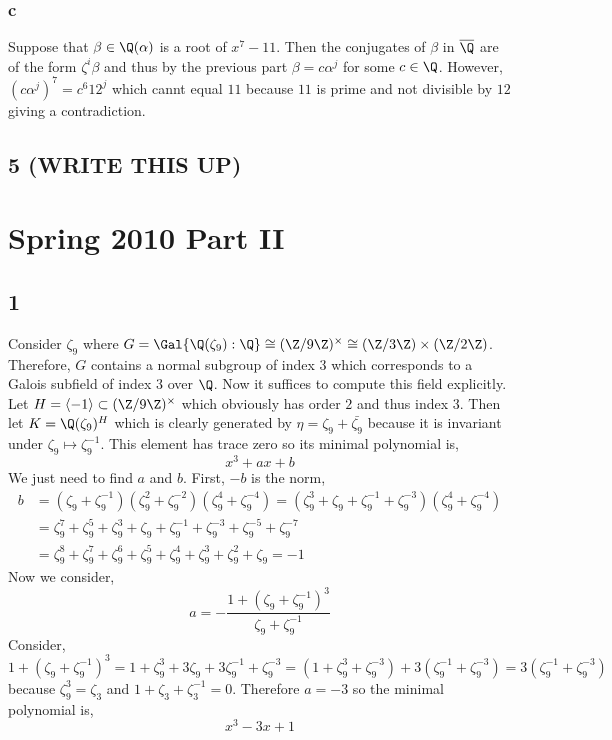 \documentclass[12pt]{article}
\begin{document}
\subsubsection{c}

Suppose that $\beta \in \Q(\alpha)$ is a root of $x^7 - 11$. Then the conjugates of $\beta$ in $\overline{\Q}$ are of the form $\zeta^i \beta$ and thus by the previous part $\beta = c \alpha^j$ for some $c \in \Q$. However, $(c \alpha^j)^7 = c^6 12^j$ which cannt equal $11$ because $11$ is prime and not divisible by $12$ giving a contradiction.

\subsection{5 (WRITE THIS UP)}


\section{Spring 2010 Part II}

\subsection{1}

Consider $\zeta_9$ where $G = \Gal{\Q(\zeta_9) : \Q} \cong (\Z / 9 \Z)^\times \cong (\Z / 3 \Z) \times (\Z / 2 \Z)$. Therefore, $G$ contains a normal subgroup of index $3$ which corresponds to a Galois subfield of index $3$ over $\Q$. Now it suffices to compute this field explicitly.
\bigskip\\
Let $H = \left< -1 \right> \subset (\Z / 9 \Z)^\times$ which obviously has order $2$ and thus index $3$. Then let $K = \Q(\zeta_9)^H$ which is clearly generated by $\eta = \zeta_9 + \bar{\zeta_9}$ because it is invariant under $\zeta_9 \mapsto \zeta_9^{-1}$. This element has trace zero so its minimal polynomial is,
\[ x^3 + a x + b \]
We just need to find $a$ and $b$. First, $-b$ is the norm,
\begin{align*}
b &= (\zeta_9 + \zeta_9^{-1})(\zeta_9^2 + \zeta_9^{-2})(\zeta_9^4 + \zeta_9^{-4}) = (\zeta_9^3 + \zeta_9 + \zeta_9^{-1} + \zeta_9^{-3})(\zeta_9^4 + \zeta_9^{-4}) 
\\
& = \zeta_9^7 + \zeta_9^5 + \zeta_9^3 + \zeta_9 + \zeta_9^{-1} + \zeta_9^{-3} + \zeta_9^{-5} + \zeta_9^{-7} 
\\
& = \zeta_9^8 + \zeta_9^7 + \zeta_9^6 + \zeta_9^5 + \zeta_9^4 + \zeta_9^3 + \zeta_9^2 + \zeta_9 = - 1
\end{align*}
Now we consider,
\[ a = -\frac{1 + (\zeta_9 + \zeta_9^{-1})^3}{\zeta_9 + \zeta_9^{-1}} \]
Consider,
\[ 1 + (\zeta_9 + \zeta_9^{-1})^3 = 1 + \zeta_9^3 + 3 \zeta_9 + 3 \zeta_9^{-1} + \zeta_9^{-3} = (1 + \zeta_9^3 + \zeta_9^{-3}) + 3 (\zeta_9^{-1} + \zeta_9^{-3}) = 3 (\zeta_9^{-1} + \zeta_9^{-3} ) \]
because $\zeta_9^3 = \zeta_3$ and $1 + \zeta_3 + \zeta_3^{-1} = 0$. Therefore $a = -3$ so the minimal polynomial is,
\[ x^3 - 3 x + 1 \]
\end{document}
